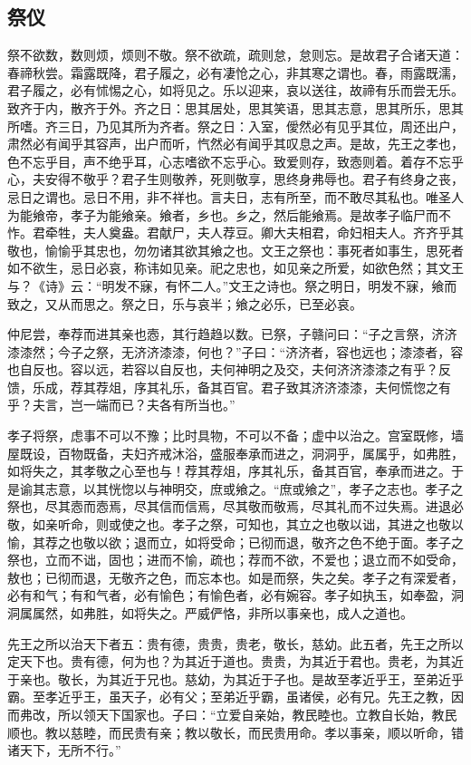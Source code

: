 \documentclass[]{article}
\begin{document}
\hypertarget{header-n636}{%
\subsection{祭仪}\label{header-n636}}

祭不欲数，数则烦，烦则不敬。祭不欲疏，疏则怠，怠则忘。是故君子合诸天道：春禘秋尝。霜露既降，君子履之，必有凄怆之心，非其寒之谓也。春，雨露既濡，君子履之，必有怵惕之心，如将见之。乐以迎来，哀以送往，故禘有乐而尝无乐。致齐于内，散齐于外。齐之日：思其居处，思其笑语，思其志意，思其所乐，思其所嗜。齐三日，乃见其所为齐者。祭之日：入室，僾然必有见乎其位，周还出户，肃然必有闻乎其容声，出户而听，忾然必有闻乎其叹息之声。是故，先王之孝也，色不忘乎目，声不绝乎耳，心志嗜欲不忘乎心。致爱则存，致悫则着。着存不忘乎心，夫安得不敬乎？君子生则敬养，死则敬享，思终身弗辱也。君子有终身之丧，忌日之谓也。忌日不用，非不祥也。言夫日，志有所至，而不敢尽其私也。唯圣人为能飨帝，孝子为能飨亲。飨者，乡也。乡之，然后能飨焉。是故孝子临尸而不怍。君牵牲，夫人奠盎。君献尸，夫人荐豆。卿大夫相君，命妇相夫人。齐齐乎其敬也，愉愉乎其忠也，勿勿诸其欲其飨之也。文王之祭也：事死者如事生，思死者如不欲生，忌日必哀，称讳如见亲。祀之忠也，如见亲之所爱，如欲色然；其文王与？《诗》云：``明发不寐，有怀二人。''文王之诗也。祭之明日，明发不寐，飨而致之，又从而思之。祭之日，乐与哀半；飨之必乐，已至必哀。

仲尼尝，奉荐而进其亲也悫，其行趋趋以数。已祭，子赣问曰：``子之言祭，济济漆漆然；今子之祭，无济济漆漆，何也？''子曰：``济济者，容也远也；漆漆者，容也自反也。容以远，若容以自反也，夫何神明之及交，夫何济济漆漆之有乎？反馈，乐成，荐其荐俎，序其礼乐，备其百官。君子致其济济漆漆，夫何慌惚之有乎？夫言，岂一端而已？夫各有所当也。''

孝子将祭，虑事不可以不豫；比时具物，不可以不备；虚中以治之。宫室既修，墙屋既设，百物既备，夫妇齐戒沐浴，盛服奉承而进之，洞洞乎，属属乎，如弗胜，如将失之，其孝敬之心至也与！荐其荐俎，序其礼乐，备其百官，奉承而进之。于是谕其志意，以其恍惚以与神明交，庶或飨之。``庶或飨之''，孝子之志也。孝子之祭也，尽其悫而悫焉，尽其信而信焉，尽其敬而敬焉，尽其礼而不过失焉。进退必敬，如亲听命，则或使之也。孝子之祭，可知也，其立之也敬以诎，其进之也敬以愉，其荐之也敬以欲；退而立，如将受命；已彻而退，敬齐之色不绝于面。孝子之祭也，立而不诎，固也；进而不愉，疏也；荐而不欲，不爱也；退立而不如受命，敖也；已彻而退，无敬齐之色，而忘本也。如是而祭，失之矣。孝子之有深爱者，必有和气；有和气者，必有愉色；有愉色者，必有婉容。孝子如执玉，如奉盈，洞洞属属然，如弗胜，如将失之。严威俨恪，非所以事亲也，成人之道也。

先王之所以治天下者五：贵有德，贵贵，贵老，敬长，慈幼。此五者，先王之所以定天下也。贵有德，何为也？为其近于道也。贵贵，为其近于君也。贵老，为其近于亲也。敬长，为其近于兄也。慈幼，为其近于子也。是故至孝近乎王，至弟近乎霸。至孝近乎王，虽天子，必有父；至弟近乎霸，虽诸侯，必有兄。先王之教，因而弗改，所以领天下国家也。子曰：``立爱自亲始，教民睦也。立教自长始，教民顺也。教以慈睦，而民贵有亲；教以敬长，而民贵用命。孝以事亲，顺以听命，错诸天下，无所不行。''
\end{document}
